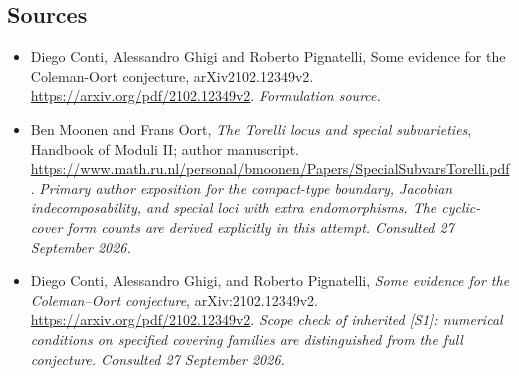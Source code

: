 \documentclass[11pt]{article}
\begin{document}
\subsection{Sources}
\begin{itemize}
\item[S1]Diego Conti, Alessandro Ghigi and Roberto Pignatelli, Some evidence for the Coleman-Oort conjecture, arXiv2102.12349v2.
\url{https://arxiv.org/pdf/2102.12349v2}.
\textit{Formulation source.}
\item[E1]Ben Moonen and Frans Oort, \emph{The Torelli locus and special
subvarieties}, Handbook of Moduli II; author manuscript.
\url{https://www.math.ru.nl/personal/bmoonen/Papers/SpecialSubvarsTorelli.pdf}.
\textit{Primary author exposition for the compact-type boundary,
Jacobian indecomposability, and special loci with extra endomorphisms.
The cyclic-cover form counts are derived explicitly in this attempt.
Consulted 27 September 2026.}
\item[E2]Diego Conti, Alessandro Ghigi, and Roberto Pignatelli,
\emph{Some evidence for the Coleman--Oort conjecture}, arXiv:2102.12349v2.
\url{https://arxiv.org/pdf/2102.12349v2}.
\textit{Scope check of inherited [S1]: numerical conditions on specified
covering families are distinguished from the full conjecture.
Consulted 27 September 2026.}

\end{itemize}
\end{document}
